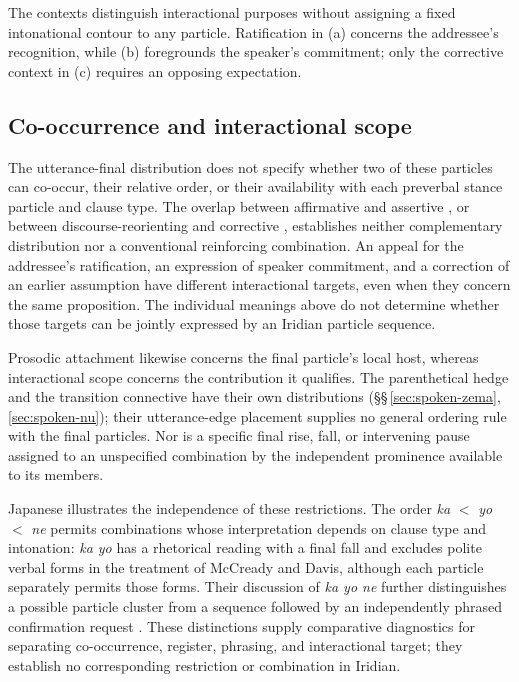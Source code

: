 The contexts distinguish interactional purposes without assigning a fixed
intonational contour to any particle. Ratification in (a) concerns the
addressee's recognition, while (b) foregrounds the speaker's commitment;
only the corrective context in (c) requires an opposing expectation.

\subsection{Co-occurrence and interactional scope}
\label{sec:final-particle-combinations}

The utterance-final distribution does not specify whether two of these
particles can co-occur, their relative order, or their availability with
each preverbal stance particle and clause type. The overlap between
affirmative  and assertive , or between
discourse-reorienting  and corrective , establishes
neither complementary distribution nor a conventional reinforcing
combination. An appeal for the addressee's ratification, an expression of
speaker commitment, and a correction of an earlier assumption have
different interactional targets, even when they concern the same
proposition. The individual meanings above do not determine whether those
targets can be jointly expressed by an Iridian particle sequence.

Prosodic attachment likewise concerns the final particle's local host,
whereas interactional scope concerns the contribution it qualifies.
The parenthetical hedge  and the transition connective
 have their own distributions
(§§\,\ref{sec:spoken-zema}, \ref{sec:spoken-nu}); their
utterance-edge placement supplies no general ordering rule with the final
particles. Nor is a specific final rise, fall, or intervening pause assigned
to an unspecified combination by the independent prominence available to
its members.

Japanese illustrates the independence of these restrictions. The order
\textit{ka} $<$ \textit{yo} $<$ \textit{ne} permits combinations whose interpretation depends
on clause type and intonation: \textit{ka yo} has a rhetorical reading
with a final fall and excludes polite verbal forms in the treatment of
McCready and Davis, although each particle separately permits those forms.
Their discussion of \textit{ka yo ne} further distinguishes a possible
particle cluster from a sequence followed by an independently phrased
confirmation request \cite[§5, manuscript pp.~21--25]{mccreadydavis2019particles}.
These distinctions supply comparative diagnostics for separating
co-occurrence, register, phrasing, and interactional target; they establish
no corresponding restriction or combination in Iridian.

